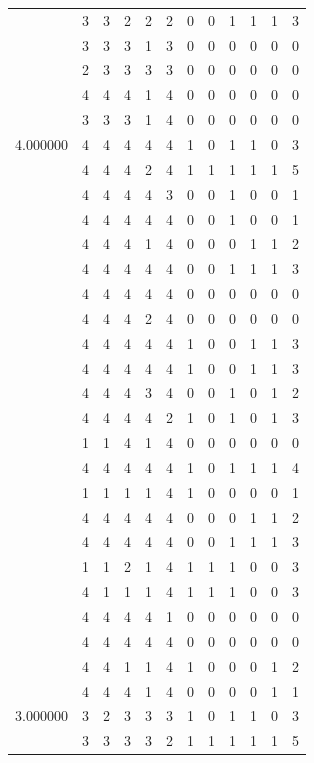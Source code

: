 \documentclass[]{book}
\theoremstyle{definition}
\theoremstyle{definition}
\theoremstyle{definition}
\theoremstyle{remark}
\begin{document}
\begin{table}
{\begin{tabular}[t]{rrrrrrrrrrrr}
 & 3 & 3 & 2 & 2 & 2 & 0 & 0 & 1 & 1 & 1 & 3\\
 & 3 & 3 & 3 & 1 & 3 & 0 & 0 & 0 & 0 & 0 & 0\\
 & 2 & 3 & 3 & 3 & 3 & 0 & 0 & 0 & 0 & 0 & 0\\
 & 4 & 4 & 4 & 1 & 4 & 0 & 0 & 0 & 0 & 0 & 0\\
 & 3 & 3 & 3 & 1 & 4 & 0 & 0 & 0 & 0 & 0 & 0\\
4.000000 & 4 & 4 & 4 & 4 & 4 & 1 & 0 & 1 & 1 & 0 & 3\\
 & 4 & 4 & 4 & 2 & 4 & 1 & 1 & 1 & 1 & 1 & 5\\
 & 4 & 4 & 4 & 4 & 3 & 0 & 0 & 1 & 0 & 0 & 1\\
 & 4 & 4 & 4 & 4 & 4 & 0 & 0 & 1 & 0 & 0 & 1\\
 & 4 & 4 & 4 & 1 & 4 & 0 & 0 & 0 & 1 & 1 & 2\\
 & 4 & 4 & 4 & 4 & 4 & 0 & 0 & 1 & 1 & 1 & 3\\
 & 4 & 4 & 4 & 4 & 4 & 0 & 0 & 0 & 0 & 0 & 0\\
 & 4 & 4 & 4 & 2 & 4 & 0 & 0 & 0 & 0 & 0 & 0\\
 & 4 & 4 & 4 & 4 & 4 & 1 & 0 & 0 & 1 & 1 & 3\\
 & 4 & 4 & 4 & 4 & 4 & 1 & 0 & 0 & 1 & 1 & 3\\
 & 4 & 4 & 4 & 3 & 4 & 0 & 0 & 1 & 0 & 1 & 2\\
 & 4 & 4 & 4 & 4 & 2 & 1 & 0 & 1 & 0 & 1 & 3\\
 & 1 & 1 & 4 & 1 & 4 & 0 & 0 & 0 & 0 & 0 & 0\\
 & 4 & 4 & 4 & 4 & 4 & 1 & 0 & 1 & 1 & 1 & 4\\
 & 1 & 1 & 1 & 1 & 4 & 1 & 0 & 0 & 0 & 0 & 1\\
 & 4 & 4 & 4 & 4 & 4 & 0 & 0 & 0 & 1 & 1 & 2\\
 & 4 & 4 & 4 & 4 & 4 & 0 & 0 & 1 & 1 & 1 & 3\\
 & 1 & 1 & 2 & 1 & 4 & 1 & 1 & 1 & 0 & 0 & 3\\
 & 4 & 1 & 1 & 1 & 4 & 1 & 1 & 1 & 0 & 0 & 3\\
 & 4 & 4 & 4 & 4 & 1 & 0 & 0 & 0 & 0 & 0 & 0\\
 & 4 & 4 & 4 & 4 & 4 & 0 & 0 & 0 & 0 & 0 & 0\\
 & 4 & 4 & 1 & 1 & 4 & 1 & 0 & 0 & 0 & 1 & 2\\
 & 4 & 4 & 4 & 1 & 4 & 0 & 0 & 0 & 0 & 1 & 1\\
3.000000 & 3 & 2 & 3 & 3 & 3 & 1 & 0 & 1 & 1 & 0 & 3\\
 & 3 & 3 & 3 & 3 & 2 & 1 & 1 & 1 & 1 & 1 & 5\\

\end{tabular}}
\end{table}
\end{document}

